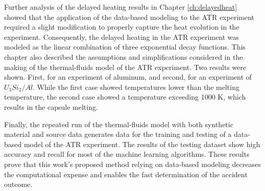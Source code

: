 Further analysis of the delayed heating results in Chapter \ref{ch:delayedheat} showed that the application of the data-based modeling to the ATR experiment required a slight modification to properly capture the heat evolution in the experiment.
Consequently, the delayed heating in the ATR experiment was modeled as the linear combination of three exponential decay functions.
This chapter also described the assumptions and simplifications considered in the making of the thermal-fluids model of the ATR experiment.
Two results were shown.
First, for an experiment of aluminum, and second, for an experiment of $U_3Si_2/Al$.
While the first case showed temperatures lower than the melting temperature, the second case showed a temperature exceeding 1000 K, which results in the capsule melting.

Finally, the repeated run of the thermal-fluids model with both synthetic material and source data generates data for the training and testing of a data-based model of the ATR experiment.
The results of the testing dataset show high accuracy and recall for most of the machine learning algorithms.
These results prove that this work's proposed method relying on data-based modeling decreases the computational expense and enables the fast determination of the accident outcome.




